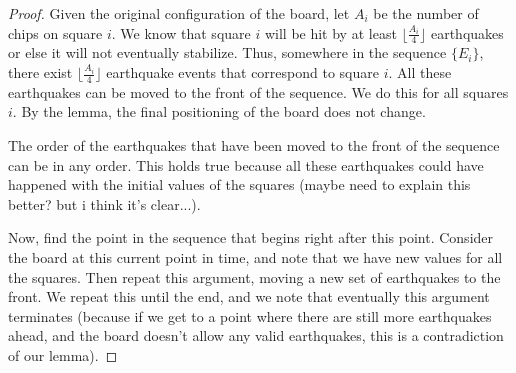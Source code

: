 \documentclass[11pt]{article}
\begin{document}
\begin{proof}
Given the original configuration of the board, let $A_i$ be the number of chips on square $i$. We know that square $i$ will be hit by at least $\lfloor \frac{A_i}{4} \rfloor$ earthquakes or else it will not eventually stabilize. Thus, somewhere in the sequence $\{E_i\}$, there exist $\lfloor \frac{A_i}{4} \rfloor$ earthquake events that correspond to square $i$. All these earthquakes can be moved to the front of the sequence. We do this for all squares $i$. By the lemma, the final positioning of the board does not change.

The order of the earthquakes that have been moved to the front of the sequence can be in any order. This holds true because all these earthquakes could have happened with the initial values of the squares (maybe need to explain this better? but i think it's clear...).

Now, find the point in the sequence that begins right after this point. Consider the board at this current point in time, and note that we have new values for all the squares. Then repeat this argument, moving a new set of earthquakes to the front. We repeat this until the end, and we note that eventually this argument terminates (because if we get to a point where there are still more earthquakes ahead, and the board doesn't allow any valid earthquakes, this is a contradiction of our lemma).

\end{proof}
\end{document}
